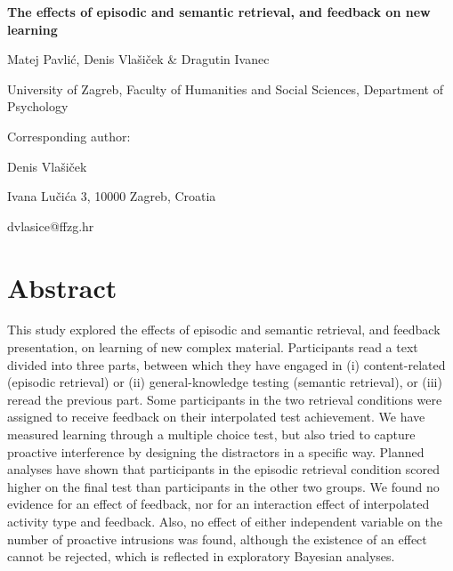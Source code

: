 \documentclass[12pt]{article}
\def\biblio{}
\begin{document}
\begin{titlepage}
    \begin{center}

        \vspace*{\fill}

        \Large
        \textbf{The effects of episodic and semantic retrieval, and feedback on new learning}
        \normalsize

        \bigskip
        Matej Pavlić, Denis Vlašiček \& Dragutin Ivanec

        University of Zagreb, Faculty of Humanities and Social Sciences,
        Department of Psychology

        \bigskip

        \raggedright
        Corresponding author:

        Denis Vlašiček

        Ivana Lučića 3, 10000 Zagreb, Croatia

        dvlasice@ffzg.hr

        \vspace*{\fill}

    \end{center}
\end{titlepage}

\def\biblio{}

\hypertarget{abstract}{%
\section{Abstract}}

This study explored the effects of episodic and semantic retrieval, and
feedback presentation, on learning of new complex material. Participants
read a text divided into three parts, between which they have engaged in
(i) content-related (episodic retrieval) or (ii) general-knowledge testing
(semantic retrieval), or (iii) reread the previous part. Some participants in
the two retrieval conditions were assigned to receive feedback on their
interpolated test achievement. We have measured learning through a multiple
choice test, but also tried to capture proactive interference by designing the
distractors in a specific way. Planned analyses have shown that participants in
the episodic retrieval condition scored higher on the final test than
participants in the other two groups. We found no evidence for an effect of
feedback, nor for an interaction effect of interpolated activity type and
feedback. Also, no effect of either independent variable on the number of
proactive intrusions was found, although the existence of an effect cannot be
rejected, which is reflected in exploratory Bayesian analyses.
\end{document}
